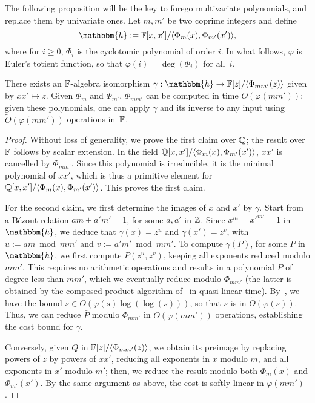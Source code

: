 The following proposition will be the key to forego multivariate
polynomials, and replace them by univariate ones.  Let $m,m'$ be two
coprime integers and define
$$\mathbbm{h}:=\F[x,x']/\langle \Phi_{m}(x), \Phi_{m'}(x')\rangle,$$
where for $i \ge 0$, $\Phi_i$ is the cyclotomic polynomial of order
$i$. In what follows, $\varphi$ is Euler's totient function, so that
$\varphi(i) = \deg(\Phi_i)$ for all~$i$.
\begin{lemma}
  There exists an $\mathbb{F}$-algebra isomorphism $\gamma: \mathbbm{h} \to
  \F[z]/\langle\Phi_{mm'}(z)\rangle$ given by $xx' \mapsto z$.  Given
  $\Phi_m$ and $\Phi_{m'}$, $\Phi_{mm'}$ can be computed in time
  $\tilde{O}(\varphi(mm'))$; given these polynomials, one can
  apply $\gamma$ and its inverse to any input using
  $\tilde{O}(\varphi(mm'))$ operations in~$\mathbb{F}$.
\end{lemma}
\begin{proof}
  Without loss of generality, we prove the first claim over $\mathbb{Q}$; the
  result over $\mathbb{F}$ follows by scalar extension. In the field \sloppy
  $\mathbb{Q}[x,x']/\langle \Phi_{m}(x), \Phi_{m'}(x')\rangle$, $xx'$ is
  cancelled by $\Phi_{mm'}$. Since this polynomial is irreducible, it
  is the minimal polynomial of $xx'$, which is thus a primitive
  element for $\mathbb{Q}[x,x']/\langle \Phi_{m}(x),
  \Phi_{m'}(x')\rangle$. This proves the first claim.

  For the second claim, we first determine the images of $x$ and $x'$
  by $\gamma$. Start from a B\'ezout relation $am+ a'm'=1$, for some
  $a,a'$ in $\mathbb{Z}$.  Since $x^m = {x'}^{m'}=1$ in $\mathbbm{h}$, we
  deduce that $\gamma(x)=z^{u}$ and $\gamma(x') = z^{v}$, with $u:=am
  \bmod mm'$ and $v:=a'm' \bmod mm'$. To compute $\gamma(P)$, for some
  $P$ in $\mathbbm{h}$, we first compute $P(z^u, z^v)$, keeping all
  exponents reduced modulo $mm'$. This requires no arithmetic
  operations and results in a polynomial $\bar P$ of degree less than
  $mm'$, which we eventually reduce modulo $\Phi_{mm'}$ (the latter is
  obtained by the composed product algorithm of~\cite{BoFlSaSc06} in
  quasi-linear time).  By~\cite[Theorem~8.8.7]{BaSh96}, we have the
  bound $s \in O(\varphi(s) \log(\log(s)))$, so that $s$ is in
  $\tilde{O}(\varphi(s))$. Thus, we can reduce $\bar P$ modulo
  $\Phi_{mm'}$ in $\tilde{O}(\varphi(mm'))$ operations, establishing
  the cost bound for $\gamma$.

Conversely, given $Q$ in $\mathbb{F}[z]/\langle\Phi_{mm'}(z)\rangle$, we
obtain its preimage by replacing powers of $z$ by powers of $xx'$,
reducing all exponents in $x$ modulo $m$, and all exponents in $x'$
modulo $m'$; then, we reduce the result modulo both $\Phi_m(x)$ and
$\Phi_{m'}(x')$.  By the same argument as above, the cost is softly
linear in $\varphi(mm')$.
\end{proof}

